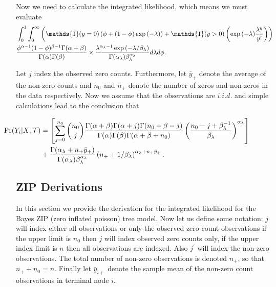 \documentclass{article}
\def\newabbrev#1{\label{#1}}
\begin{document}
 Now we need to calculate the integrated likelihood, which means we must evaluate 
 \begin{align} \hspace{-.9in}
 &\int_0^1\int_0^\infty \left(\mathds{1}(y=0)\left(\phi + (1-\phi)\exp{(-\lambda)}\right) + \mathds{1}(y>0)\left(\exp{(-\lambda)}\frac{\lambda^y}{y!}\right)\right) \\ \nonumber
 & \frac{\phi^{\alpha-1}(1-\phi)^{\beta-1}\Gamma(\alpha+\beta)}{\Gamma(\alpha)\Gamma(\beta)} \times \frac{ \lambda^{\alpha_{\lambda}-1}\exp{(-\lambda/\beta_{\lambda})} }{\Gamma(\alpha_{\lambda})\beta_{\lambda}^{\alpha_{\lambda}}}d\lambda d\phi.
 \end{align}
 
 Let $j$ index the observed zero counts. Furthermore, let $\bar{y}_{+}$ denote the average of the non-zero counts and $n_0$ and $n_+$ denote the number of zeros and non-zeros in the data respectively. 
 Now we assume that the observations are $i.i.d.$ and simple calculations lead to the conclusion that
 
 \begin{align}\label{eqn:zip_int_lhood}\hspace{-.7in}
 \Pr(Y_i\vert X, \mathcal{T})& = \left[\sum_{j=0}^{n_0} {n_0 \choose j}\frac{\Gamma(\alpha+\beta)\Gamma(\alpha+j)\Gamma(n_0+\beta-j)}{\Gamma(\alpha)\Gamma(\beta)\Gamma(\alpha+\beta+n_0)}\left(\frac{n_0-j+\beta_{\lambda}^{-1}}{\beta_{\lambda}}\right)^{\alpha_{\lambda}} \right] \\ \nonumber
 & + \frac{\Gamma(\alpha_{\lambda}+n_+\bar{y}_+)}{\Gamma(\alpha_{\lambda})\beta_{\lambda}^{\alpha_{\lambda}}}\left(n_+ + 1/\beta_{\lambda} \right)^{\alpha_{\lambda}+n_+\bar{y}_+}.
\end{align}

\subsection{ZIP Derivations}

In this section we provide the derivation for the integrated likelihood for the Bayes ZIP\newabbrev{abbrev:ZIP} (zero inflated poisson) tree model. Now let us define some notation: $j$ will index either all observations or only the observed zero count observations if the upper limit is $n_0$ then $j$ will index observed zero counts only, if the upper index limit is $n$ then all observations are indexed. Also $j^{\prime}$ will index the non-zero observations. The total number of non-zero observations is denoted $n_+$, so that $n_++n_0=n$. Finally let $\bar{y}_{i+}$ denote the sample mean of the non-zero count observations in terminal node $i$. 
\end{document}
